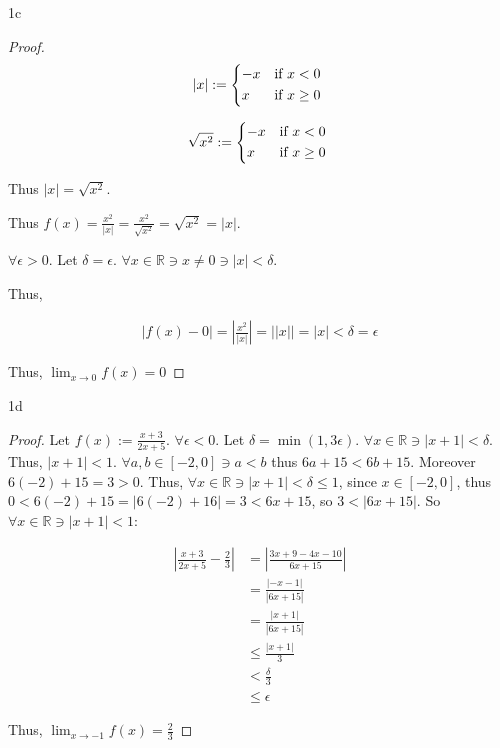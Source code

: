 \documentclass{article}
\newcommand{\R}{\mathbb{R}}
\newcommand{\abs}[1]{\left\lvert #1\right\rvert}
\begin{document}
\begin{PROB}{1c}\label{Problem 1c.}
\end{PROB}
\begin{proof}

    \begin{equation*}
        \abs{x} := \begin{cases*}
            -x & \text{if} $x < 0$ \\
            x & \text{if} $x \geq 0$
        \end{cases*}
    \end{equation*}

    \begin{equation*}
        \sqrt{x^2} := \begin{cases*}
            -x & \text{if} $x < 0$ \\
            x & \text{if} $x \geq 0$
        \end{cases*}
    \end{equation*}

    Thus $\abs{x} = \sqrt{x^2}$.   

    Thus $f(x) = \frac{x^2}{\abs{x}} = \frac{x^2}{\sqrt{x^2}} = \sqrt{x^2} = \abs{x}$. 
    
    $\forall \epsilon > 0$. Let $\delta = \epsilon$. $\forall x \in \R \ni x \neq 0 \ni \abs{x} < \delta$. 
    
    Thus, 

    \begin{align*}
        \abs{f(x) - 0} = \abs{\frac{x^2}{\abs{x}}} = \abs{\abs{x}} = \abs{x} < \delta = \epsilon
    \end{align*} 

    Thus, $\lim_{x \to 0} f(x) = 0$
\end{proof}

\begin{PROB}{1d}\label{Problem 1d.}
\end{PROB}
\begin{proof}
    Let $f(x) := \frac{x + 3}{2x + 5}$.  
    $\forall \epsilon < 0$. Let $\delta = \min(1, 3 \epsilon)$. $\forall x \in \R \ni \abs{x + 1} < \delta$. Thus, $\abs{x + 1} < 1$. $\forall a, b \in [-2, 0] \ni a < b$ thus $6a + 15 < 6b + 15$. Moreover $6(-2) + 15 = 3 > 0$. Thus, $\forall x \in \R \ni \abs{x  + 1} < \delta \leq 1$, since $x \in [-2, 0]$, thus $0 < 6(-2) + 15 = \abs{6(-2) + 16} = 3 < 6x + 15$, so $3 < \abs{6x + 15}$. So $\forall x \in \R \ni \abs{x + 1} < 1$:              

    \begin{align*}
        \abs{\frac{x + 3}{2x + 5} - \frac{2}{3}} &= \abs{\frac{3x + 9 - 4x - 10}{6x + 15}} \\
        &= \frac{\abs{-x - 1}}{\abs{6x + 15}} \\
        &= \frac{\abs{x + 1}}{\abs{6x + 15}} \\
        &\leq \frac{\abs{x + 1}}{3} \\
        &< \frac{\delta}{3} \\
        &\leq \epsilon
    \end{align*}


    Thus, $\lim_{x \to -1} f(x) = \frac{2}{3}$ 
\end{proof}
\end{document}
